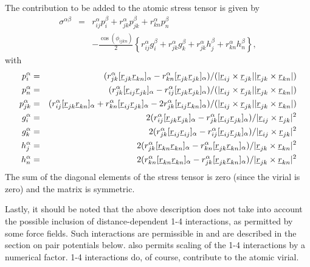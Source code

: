The contribution to be added to the atomic stress tensor is given by
\begin{eqnarray}
\sigma^{\alpha \beta}&=&r_{ij}^{\alpha}p_{i}^{\beta}+
r_{jk}^{\alpha}p_{jk}^{\beta}+r_{kn}^{\alpha}p_{n}^{\beta} \\ & &
-\frac{\cos(\phi_{ijkn})}{2}\left \{r_{ij}^{\alpha}g_{i}^{\beta}+
r_{jk}^{\alpha}g_{k}^{\beta}+r_{jk}^{\alpha}h_{j}^{\beta}+r_{kn}^{\alpha}h_{n}^{\beta}\right\}
,\nonumber
\end{eqnarray}
with
\begin{eqnarray}
p_{i}^{\alpha}&=&(r_{jk}^{\alpha}[\mbox{$\underline{r}$}_{jk}\mbox{$\underline{r}$}_{kn}]_{\alpha}-
r_{kn}^{\alpha}[\mbox{$\underline{r}$}_{jk}\mbox{$\underline{r}$}_{jk}]_{\alpha})/
(|\mbox{$\underline{r}$}_{ij}\times\mbox{$\underline{r}$}_{jk}||\mbox{$\underline{r}$}_{jk}\times\mbox{$\underline{r}$}_{kn}|)\\
p_{n}^{\alpha}&=&(r_{jk}^{\alpha}[\mbox{$\underline{r}$}_{ij}\mbox{$\underline{r}$}_{jk}]_{\alpha}-
r_{ij}^{\alpha}[\mbox{$\underline{r}$}_{jk}\mbox{$\underline{r}$}_{jk}]_{\alpha})/
(|\mbox{$\underline{r}$}_{ij}\times\mbox{$\underline{r}$}_{jk}||\mbox{$\underline{r}$}_{jk}\times\mbox{$\underline{r}$}_{kn}|)\\
p_{jk}^{\alpha}&=&(r_{ij}^{\alpha}[\mbox{$\underline{r}$}_{jk}\mbox{$\underline{r}$}_{kn}]_{\alpha}+
r_{kn}^{\alpha}[\mbox{$\underline{r}$}_{ij}\mbox{$\underline{r}$}_{jk}]_{\alpha}-
2r_{jk}^{\alpha}[\mbox{$\underline{r}$}_{ij}\mbox{$\underline{r}$}_{kn}]_{\alpha})/
(|\mbox{$\underline{r}$}_{ij}\times\mbox{$\underline{r}$}_{jk}||\mbox{$\underline{r}$}_{jk}\times\mbox{$\underline{r}$}_{kn}|)\\
g_{i}^{\alpha}&=&2(r_{ij}^{\alpha}[\mbox{$\underline{r}$}_{jk}\mbox{$\underline{r}$}_{jk}]_{\alpha}-
r_{jk}^{\alpha}[\mbox{$\underline{r}$}_{ij}\mbox{$\underline{r}$}_{jk}]_{\alpha})/
|\mbox{$\underline{r}$}_{ij}\times\mbox{$\underline{r}$}_{jk}|^{2}\\
g_{k}^{\alpha}&=&2(r_{jk}^{\alpha}[\mbox{$\underline{r}$}_{ij}\mbox{$\underline{r}$}_{ij}]_{\alpha}-
r_{ij}^{\alpha}[\mbox{$\underline{r}$}_{ij}\mbox{$\underline{r}$}_{jk}]_{\alpha})/
|\mbox{$\underline{r}$}_{ij}\times\mbox{$\underline{r}$}_{jk}|^{2}\\
h_{j}^{\alpha}&=&2(r_{jk}^{\alpha}[\mbox{$\underline{r}$}_{kn}\mbox{$\underline{r}$}_{kn}]_{\alpha}-
r_{kn}^{\alpha}[\mbox{$\underline{r}$}_{jk}\mbox{$\underline{r}$}_{kn}]_{\alpha})/
|\mbox{$\underline{r}$}_{jk}\times\mbox{$\underline{r}$}_{kn}|^{2}\\
h_{n}^{\alpha}&=&2(r_{kn}^{\alpha}[\mbox{$\underline{r}$}_{kn}\mbox{$\underline{r}$}_{kn}]_{\alpha}-
r_{jk}^{\alpha}[\mbox{$\underline{r}$}_{jk}\mbox{$\underline{r}$}_{kn}]_{\alpha})/
|\mbox{$\underline{r}$}_{jk}\times\mbox{$\underline{r}$}_{kn}|^{2}
\end{eqnarray}
The sum of the diagonal elements of the stress tensor is zero (since
the virial is zero) and the matrix is symmetric.

Lastly, it should be noted that the above description does not take
into account the possible inclusion of distance-dependent 1-4
interactions, as permitted by some force fields. Such interactions are
permissible in \D{} and are described in the section on pair
potentials below. \D{} also permits scaling of the 1-4
interactions by a numerical factor. 1-4 interactions do, of
course, contribute to the atomic virial.

